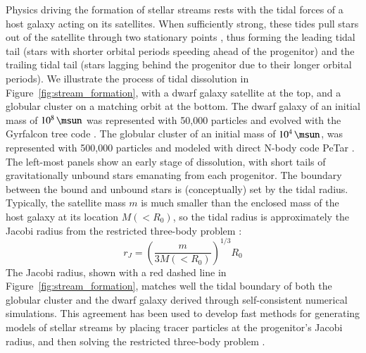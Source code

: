 \documentclass[final,5p,times,twocolumn,authoryear]{elsarticle}
\begin{document}
Physics driving the formation of stellar streams rests with the tidal forces of a host galaxy acting on its satellites.
When sufficiently strong, these tides pull stars out of the satellite through two stationary points \citep{bt:2008}, thus forming the leading tidal tail (stars with shorter orbital periods speeding ahead of the progenitor) and the trailing tidal tail (stars lagging behind the progenitor due to their longer orbital periods).
We illustrate the process of tidal dissolution in Figure~\ref{fig:stream_formation}, with a dwarf galaxy satellite at the top, and a globular cluster on a matching orbit at the bottom.
The dwarf galaxy of an initial mass of $10^8\,\unit{\msun}$ was represented with 50,000 particles and evolved with the Gyrfalcon tree code \citep{dehnen:2014}.
The globular cluster of an initial mass of $10^4\,\unit{\msun}$, was represented with 500,000 particles and modeled with direct N-body code PeTar \citep{wang:2020}.
The left-most panels show an early stage of dissolution, with short tails of gravitationally unbound stars emanating from each progenitor.
The boundary between the bound and unbound stars is (conceptually) set by the tidal
radius.
Typically, the satellite mass $m$ is much smaller than the enclosed mass of the host galaxy at its location $M(<R_0)$, so the tidal radius is approximately the Jacobi radius from the restricted three-body problem \citep[][]{szebehely:1967, valtonen:2006}:
\begin{equation}
r_J = \left(\frac{m}{3M(<R_0)}\right)^{1/3} R_0
\end{equation}
The Jacobi radius, shown with a red dashed line in Figure~\ref{fig:stream_formation}, matches well the tidal boundary of both the globular cluster and the dwarf galaxy derived through self-consistent numerical simulations.
This agreement has been used to develop fast methods for generating models of stellar streams by placing tracer particles at the progenitor's Jacobi radius, and then solving the restricted three-body problem \citep[the so-called \emph{particle-spray methods};][]{varghese:2011, lane:2012, kupper:2012, bonaca:2014, gibbons:2014, fardal:2015}.
\end{document}
